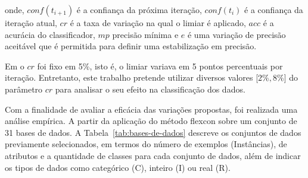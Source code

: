     \noindent
    onde, $conf(t_{i+1})$ é a confiança da próxima iteração, $conf(t_i)$ é a confiança da iteração atual, $cr$ é a taxa de variação na qual o limiar é aplicado, $acc$ é a acurácia do classificador, $mp$ precisão mínima e $e$ é uma variação de precisão aceitável que é permitida para definir uma estabilização em precisão.

    Em  o $cr$ foi fixo em 5\%, isto é, o limiar variava em 5 pontos percentuais por iteração. Entretanto, este trabalho pretende utilizar diversos valores [$2\%, 8\%$] do parâmetro $cr$ para analisar o seu efeito na classificação dos dados.



    Com a finalidade de avaliar a eficácia das variações propostas, foi realizada uma análise empírica. A partir da aplicação do método \ac{flexcon} sobre um conjunto de 31 bases de dados. A Tabela~\ref{tab:bases-de-dados} descreve os conjuntos de dados previamente selecionados, em termos do número de exemplos (Instâncias), de atributos e a quantidade de classes para cada conjunto de dados, além de indicar os tipos de dados como categórico (C), inteiro (I) ou real (R).

